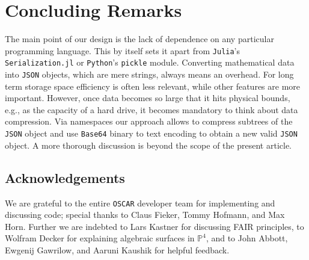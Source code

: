 \documentclass[runningheads]{llncs}
\newcommand\OSCAR{\texttt{OSCAR}\xspace}
\newcommand\Julia{\texttt{Julia}\xspace}
\newcommand\python{\texttt{Python}\xspace}
\newcommand\JSON{\texttt{JSON}\xspace}
\newcommand\Base{\texttt{Base64}\xspace}
\newcommand\PP{{\mathbb P}}
\begin{document}
\section{Concluding Remarks}
The main point of our design is the lack of dependence on any particular programming language. This by itself sets it apart from \Julia's \texttt{Serialization.jl} or \python's \texttt{pickle} module.
Converting mathematical data into \JSON objects, which are mere strings, always means an overhead.
For long term storage space efficiency is often less relevant, while other features are more important.
However, once data becomes so large that it hits physical bounds, e.g., as the capacity of a hard drive, it becomes mandatory to think about data compression.
Via namespaces our approach allows to compress subtrees of the \JSON object and use \Base binary to text encoding to obtain a new valid \JSON object.
A more thorough discussion is beyond the scope of the present article.

\subsection*{Acknowledgements}
We are grateful to the entire \OSCAR developer team for implementing and discussing code; special thanks to Claus Fieker, Tommy Hofmann, and Max Horn.
Further we are indebted to Lars Kastner for discussing FAIR principles, to Wolfram Decker for explaining algebraic surfaces in $\PP^4$, and to John Abbott,
Ewgenij Gawrilow, and Aaruni Kaushik for helpful feedback.



\end{document}
